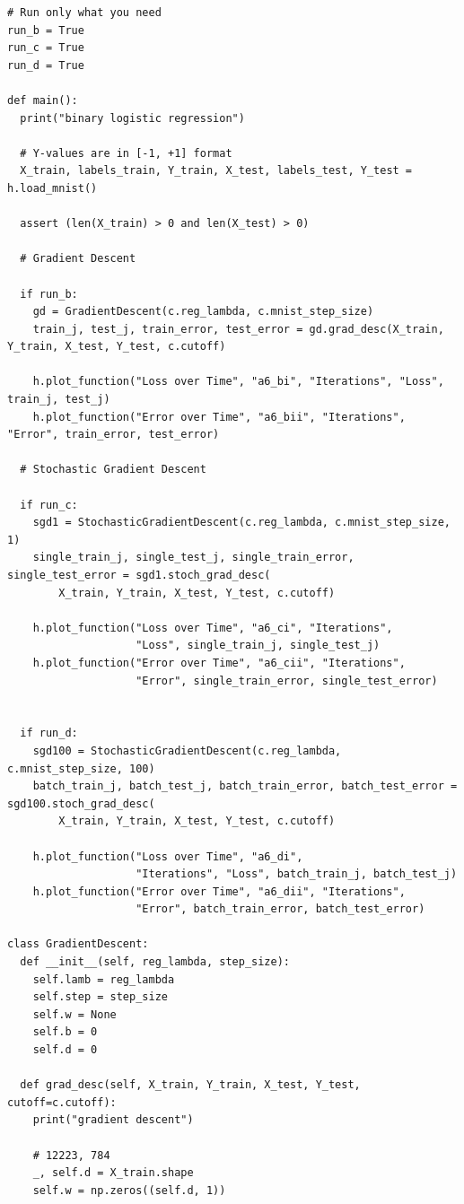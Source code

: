 \documentclass{article}
\newcommand{\1}{\mathbf{1}}
\begin{document}
{\begin{verbatim}
# Run only what you need
run_b = True
run_c = True
run_d = True

def main():
  print("binary logistic regression")

  # Y-values are in [-1, +1] format
  X_train, labels_train, Y_train, X_test, labels_test, Y_test = h.load_mnist()

  assert (len(X_train) > 0 and len(X_test) > 0)
  
  # Gradient Descent

  if run_b:
    gd = GradientDescent(c.reg_lambda, c.mnist_step_size)
    train_j, test_j, train_error, test_error = gd.grad_desc(X_train, Y_train, X_test, Y_test, c.cutoff)

    h.plot_function("Loss over Time", "a6_bi", "Iterations", "Loss", train_j, test_j)
    h.plot_function("Error over Time", "a6_bii", "Iterations", "Error", train_error, test_error)

  # Stochastic Gradient Descent
  
  if run_c:
    sgd1 = StochasticGradientDescent(c.reg_lambda, c.mnist_step_size, 1)
    single_train_j, single_test_j, single_train_error, single_test_error = sgd1.stoch_grad_desc(
        X_train, Y_train, X_test, Y_test, c.cutoff)

    h.plot_function("Loss over Time", "a6_ci", "Iterations",
                    "Loss", single_train_j, single_test_j)
    h.plot_function("Error over Time", "a6_cii", "Iterations",
                    "Error", single_train_error, single_test_error)
    

  if run_d:
    sgd100 = StochasticGradientDescent(c.reg_lambda, c.mnist_step_size, 100)
    batch_train_j, batch_test_j, batch_train_error, batch_test_error = sgd100.stoch_grad_desc(
        X_train, Y_train, X_test, Y_test, c.cutoff)

    h.plot_function("Loss over Time", "a6_di",
                    "Iterations", "Loss", batch_train_j, batch_test_j)
    h.plot_function("Error over Time", "a6_dii", "Iterations",
                    "Error", batch_train_error, batch_test_error)

class GradientDescent:
  def __init__(self, reg_lambda, step_size):
    self.lamb = reg_lambda
    self.step = step_size
    self.w = None
    self.b = 0
    self.d = 0

  def grad_desc(self, X_train, Y_train, X_test, Y_test, cutoff=c.cutoff):
    print("gradient descent")
    
    # 12223, 784
    _, self.d = X_train.shape
    self.w = np.zeros((self.d, 1))


\end{verbatim}}
\end{document}
